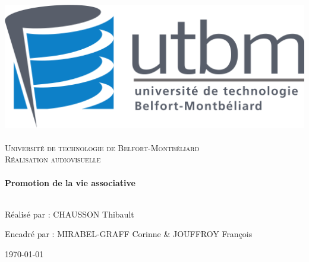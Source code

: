 
\thispagestyle{empty}
    \begin{sffamily}
        \begin{center}





            \includegraphics[scale=0.2]{ressources/logo}~\\[1cm]

            \textsc{\LARGE Université de technologie de Belfort-Montbéliard}\\[2cm]

            \textsc{\Large Réalisation audiovisuelle}\\[1cm]

            {\color{UTBMcolor}\HRule} \\[0.4cm]
            { \huge \bfseries Promotion de la vie associative\\[0.4cm] }
            {\color{UTBMcolor}\HRule} \\[1,5cm]



            \begin{center}
                Réalisé par : CHAUSSON Thibault
    
                \vspace{0,5cm}
                
                Encadré par : MIRABEL-GRAFF Corinne \& JOUFFROY François
            \end{center}




            \vfill

            \textsc{\large \today}

        \end{center}
    \end{sffamily}

